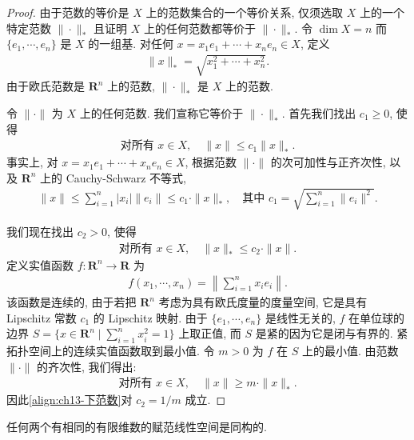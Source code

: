 \documentclass[../../main.tex]{subfiles}
\begin{document}
\begin{proof}
由于范数的等价是 $X$ 上的范数集合的一个等价关系, 仅须选取 $X$ 上的一个特定范数 $\|\cdot\|_{*}$ 且证明 $X$ 上的任何范数都等价于 $\|\cdot\|_{*}$. 令 $\dim X=n$ 而 $\{e_{1},\cdots,e_{n}\}$ 是 $X$ 的一组基. 对任何 $x=x_{1}e_{1}+\cdots+x_{n}e_{n}\in X$, 定义
\begin{align*}
\|x\|_{*}=\sqrt{x_{1}^{2}+\cdots+x_{n}^{2}}.
\end{align*}
由于欧氏范数是 $\mathbf{R}^{n}$ 上的范数, $\|\cdot\|_{*}$ 是 $X$ 上的范数.

令 $\|\cdot\|$ 为 $X$ 上的任何范数. 我们宣称它等价于 $\|\cdot\|_{*}$. 首先我们找出 $c_{1}\geqslant 0$, 使得
\begin{align}
\text{对所有 }x\in X,\quad\|x\|\leqslant c_{1}\|x\|_{*}.\label{align:ch13-上范数}
\end{align}
事实上, 对 $x=x_{1}e_{1}+\cdots+x_{n}e_{n}\in X$, 根据范数 $\|\cdot\|$ 的次可加性与正齐次性, 以及 $\mathbf{R}^{n}$ 上的 Cauchy-Schwarz 不等式,
\begin{align*}
\|x\|\leqslant\sum_{i=1}^{n}|x_{i}|\|e_{i}\|\leqslant c_{1}\cdot\|x\|_{*},\quad\text{其中 }c_{1}=\sqrt{\sum_{i=1}^{n}\|e_{i}\|^{2}}.
\end{align*}

我们现在找出 $c_{2}>0$, 使得
\begin{align}
\text{对所有 }x\in X,\quad\|x\|_{*}\leqslant c_{2}\cdot\|x\|.\label{align:ch13-下范数}
\end{align}
定义实值函数 $f:\mathbf{R}^{n}\to\mathbf{R}$ 为
\begin{align*}
f(x_{1},\cdots,x_{n})=\left\|\sum_{i=1}^{n}x_{i}e_{i}\right\|.
\end{align*}
该函数是连续的, 由于若把 $\mathbf{R}^{n}$ 考虑为具有欧氏度量的度量空间, 它是具有 Lipschitz 常数 $c_{1}$ 的 Lipschitz 映射. 由于 $\{e_{1},\cdots,e_{n}\}$ 是线性无关的, $f$ 在单位球的边界 $S=\{x\in\mathbf{R}^{n}\mid\sum_{i=1}^{n}x_{i}^{2}=1\}$ 上取正值, 而 $S$ 是紧的因为它是闭与有界的. 紧拓扑空间上的连续实值函数取到最小值. 令 $m>0$ 为 $f$ 在 $S$ 上的最小值. 由范数 $\|\cdot\|$ 的齐次性, 我们得出:
\begin{align*}
\text{对所有 }x\in X,\quad\|x\|\geqslant m\cdot\|x\|_{*}.
\end{align*}
因此\eqref{align:ch13-下范数}对 $c_{2}=1/m$ 成立.
\end{proof}

\begin{corollary}\label{corollary:ch13-有限维同构}
任何两个有相同的有限维数的赋范线性空间是同构的.
\end{corollary}
\end{document}
